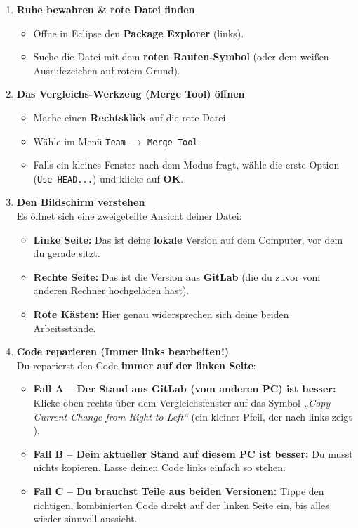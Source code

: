 \begin{enumerate}[label=\textbf{Schritt \arabic*:}, leftmargin=*, itemsep=0em]

    \item \textbf{Ruhe bewahren \& rote Datei finden}
    \begin{itemize}[label=\textbullet]
        \item Öffne in Eclipse den \textbf{Package Explorer} (links).
        \item Suche die Datei mit dem \textbf{roten Rauten-Symbol} (oder dem weißen 
		Ausrufezeichen auf rotem Grund).
    \end{itemize}

    \item \textbf{Das Vergleichs-Werkzeug (Merge Tool) öffnen}
    \begin{itemize}[label=\textbullet]
        \item Mache einen \textbf{Rechtsklick} auf die rote Datei.
        \item Wähle im Menü \texttt{Team} $\rightarrow$ \texttt{Merge Tool}.
        \item Falls ein kleines Fenster nach dem Modus fragt, wähle die erste Option 
		(\texttt{Use HEAD...}) und klicke auf \textbf{OK}.
    \end{itemize}

    \item \textbf{Den Bildschirm verstehen} \\
    Es öffnet sich eine zweigeteilte Ansicht deiner Datei:
    \begin{itemize}[label=\textbullet]
        \item \textbf{Linke Seite:} Das ist deine \textbf{lokale} Version auf dem 
		Computer, vor dem du gerade sitzt.
        \item \textbf{Rechte Seite:} Das ist die Version aus \textbf{GitLab} (die 
		du zuvor vom anderen Rechner hochgeladen hast).
        \item \textbf{Rote Kästen:} Hier genau widersprechen sich deine beiden 
		Arbeitsstände.
    \end{itemize}

    \item \textbf{Code reparieren (Immer links bearbeiten!)} \\
    Du reparierst den Code \textbf{immer auf der linken Seite}:
    \begin{itemize}[label=\textbullet]
        \item \textbf{Fall A -- Der Stand aus GitLab (vom anderen PC) ist besser:} 
		Klicke oben rechts über dem Vergleichsfenster auf das Symbol \textit{„Copy 
		Current Change from Right to Left“} (ein kleiner Pfeil, der nach links zeigt 
		\faArrowLeft).
        \item \textbf{Fall B -- Dein aktueller Stand auf diesem PC ist besser:} Du 
		musst nichts kopieren. Lasse deinen Code links einfach so stehen.
        \item \textbf{Fall C -- Du brauchst Teile aus beiden Versionen:} Tippe den 
		richtigen, kombinierten Code direkt auf der linken Seite ein, bis alles wieder 
		sinnvoll aussieht.
    \end{itemize}


\end{enumerate}
